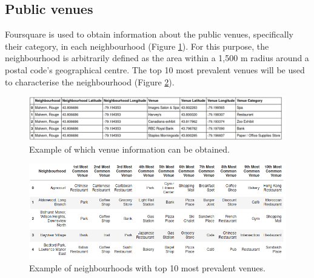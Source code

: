 \documentclass{article}
\begin{document}
\subsection{Public venues}
Foursquare is used to obtain information about the public venues, specifically their category, in each neighbourhood (Figure \ref{fig:venues}). For this purpose, the neighbourhood is arbitrarily defined as the area within a 1,500 m radius around a postal code's geographical centre. The top 10 most prevalent venues will be used to characterise the neighbourhood (Figure \ref{fig:grouped}).
\begin{figure}[ht]
 \includegraphics[width=\textwidth]{pics/venues.png}
 \caption{Example of which venue information can be obtained.}\label{fig:venues}
\end{figure}
\begin{figure}[ht]
 \includegraphics[width=\textwidth]{pics/grouped.png}
 \caption{Example of neighbourhoods with top 10 most prevalent venues.}\label{fig:grouped}
\end{figure}
\end{document}
